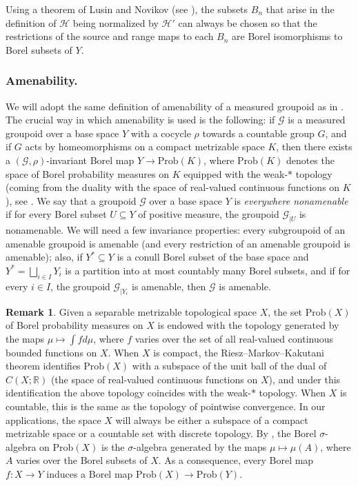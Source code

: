 \documentclass[JEP,XML,SOM,Unicode,NoFloatCountersInSection,published]{cedram}
\let\mathcal\mathscr
\theoremstyle{plain}
\theoremstyle{definition}
\newtheorem{rk}[theo]{Remark}
\let\Dunion\bigsqcup
\newcommand{\calg}{\mathcal{G}}
\newcommand{\calh}{\mathcal{H}}
\newcommand{\Prob}{\mathrm{Prob}}
\begin{document}
Using a theorem of Lusin and Novikov (see \cite[Th.\,18.10]{Kec}), the subsets $B_n$ that arise in the definition of $\calh$ being normalized by $\calh'$ can always be chosen so that the restrictions of the source and range maps to each $B_n$ are Borel isomorphisms to Borel subsets of $Y$.

\subsubsection*{Amenability.}

We will adopt the same definition of amenability of a measured groupoid as in \cite{Kid-survey}. The crucial way in which amenability is used is the following: if $\calg$ is a measured groupoid over a base space $Y$ with a cocycle $\rho$ towards a countable group $G$, and if $G$ acts by homeomorphisms on a compact metrizable space $K$, then there exists a $(\calg,\rho)$-invariant Borel map $Y\to\Prob(K)$, where $\Prob(K)$ denotes the space of Borel probability measures on $K$ equipped with the weak-$*$ topology (coming from the duality with the space of real-valued continuous functions on $K$), see \cite[Prop.\,4.14]{Kid-survey}. We say that a groupoid $\calg$ over a base space $Y$ is \emph{everywhere nonamenable} if for every Borel subset $U\subseteq Y$ of positive measure, the groupoid $\calg_{|U}$ is nonamenable. We will need a few invariance properties: every subgroupoid of an amenable groupoid is amenable \cite[Th.\,4.16]{Kid-survey} (and every restriction of an amenable groupoid is amenable); also, if $Y^*\subseteq Y$ is a conull Borel subset of the base space and $Y^*=\Dunion_{i\in I} Y_i$ is a partition into at most countably many Borel subsets, and if for every $i\in I$, the groupoid $\calg_{|Y_i}$ is amenable, then $\calg$ is amenable.

\begin{rk}
\label{rk:Borel}
Given a separable metrizable topological space $X$, the set $\Prob(X)$ of Borel probability measures on $X$ is endowed with the topology generated by the maps $\mu\mapsto\int fd\mu$, where $f$ varies over the set of all real-valued continuous bounded functions on $X$. When $X$ is compact, the Riesz--Markov--Kakutani theorem identifies $\Prob(X)$ with a subspace of the unit ball of the dual of $C(X;\mathbb{R})$ (the space of real-valued continuous functions on $X$), and under this identification the above topology coincides with the weak-$*$ topology. When $X$ is countable, this is the same as the topology of pointwise convergence. In our applications, the space $X$ will always be either a subspace of a compact metrizable space or a countable set with discrete topology. By \cite[Th.\,17.24]{Kec}, the Borel $\sigma$-algebra on $\Prob(X)$ is the $\sigma$-algebra generated by the maps $\mu\mapsto\mu(A)$, where $A$ varies over the Borel subsets of $X$. As a consequence, every Borel map $f:X\to Y$ induces a Borel map $\Prob(X)\to\Prob(Y)$.
\end{rk}
\end{document}
